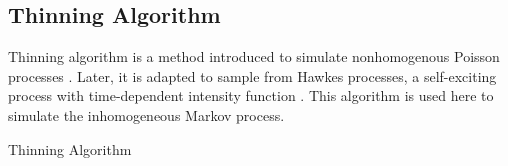 \subsection{Thinning Algorithm}
Thinning algorithm is a method introduced to simulate nonhomogenous Poisson processes \cite{Lewis1979}. Later, it is adapted to sample from Hawkes processes, a self-exciting process with time-dependent intensity function \cite{Ogaata1981, Rizoiu2017}. This algorithm is used here to simulate the inhomogeneous Markov process.

\begin{algorithm}[H]
	
	
	\begin{algorithmic}[1]
		\ENDIF
		\ENDWHILE
	\end{algorithmic}
	\caption{Thinning Algorithm}
\end{algorithm}